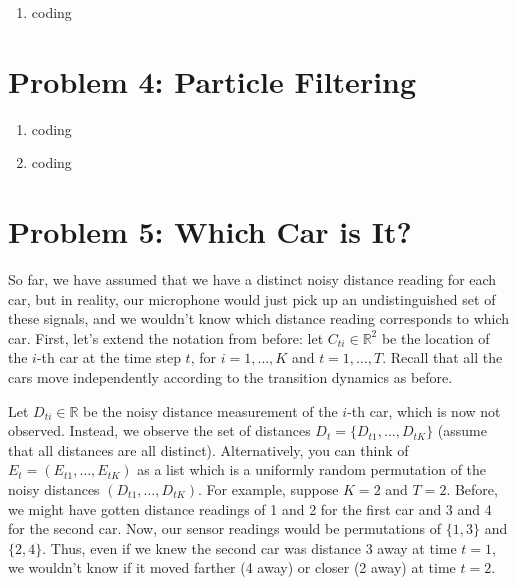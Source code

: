 \documentclass[10pt]{article}
\begin{document}
\begin{enumerate}[label=(\alph*)]

  \item coding

\end{enumerate}
\iffalse
\section*{\normalsize Problem 4: Particle Filtering}

\begin{enumerate}[label=(\alph*)]

  \item coding
  
  \item coding  

\end{enumerate}

\section*{\normalsize Problem 5: Which Car is It?}

So far, we have assumed that we have a distinct noisy distance reading for each car, but in reality, our microphone would just pick up an undistinguished set of these signals, and we wouldn't know which distance reading corresponds to which car. First, let's extend the notation from before: let $C_{ti} \in \mathbb{R}^2$ be the location of the $i$-th car at the time step $t$, for $i = 1, \dots, K$ and $t = 1, \dots, T$. Recall that all the cars move independently according to the transition dynamics as before.
\smallskip 

Let $D_{ti} \in \mathbb{R}$ be the noisy distance measurement of the $i$-th car, which is now not observed. Instead, we observe the set of distances $D_t = \{D_{t1}, \dots, D_{tK}\}$ (assume that all distances are all distinct). Alternatively, you can think of $E_t = (E_{t1}, \dots, E_{tK})$ as a list which is a uniformly random permutation of the noisy distances $(D_{t1}, \dots, D_{tK})$. For example, suppose $K = 2$ and $T = 2$. Before, we might have gotten distance readings of 1 and 2 for the first car and 3 and 4 for the second car. Now, our sensor readings would be permutations of $\{1, 3\}$ and $\{2 ,4\}$. Thus, even if we knew the second car was distance 3 away at time $t = 1$, we wouldn't know if it moved farther (4 away) or closer (2 away) at time $t = 2$.
\end{document}
